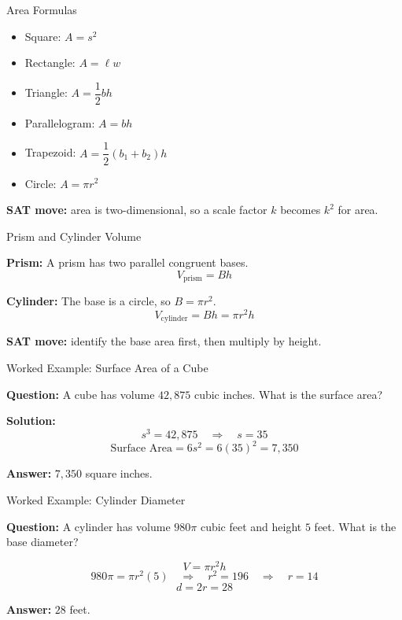 \documentclass{beamer}
\begin{document}
\begin{frame}{Area Formulas}

\begin{itemize}
    \item Square: $A = s^2$
    \item Rectangle: $A = \ell w$
    \item Triangle: $A = \dfrac{1}{2}bh$
    \item Parallelogram: $A = bh$
    \item Trapezoid: $A = \dfrac{1}{2}(b_1+b_2)h$
    \item Circle: $A = \pi r^2$
\end{itemize}

\vspace{0.2cm}
\textbf{SAT move:} area is two-dimensional, so a scale factor $k$ becomes $k^2$ for area.

\end{frame}

\begin{frame}{Prism and Cylinder Volume}

\textbf{Prism:} A prism has two parallel congruent bases.
\[
V_{\text{prism}} = Bh
\]

\textbf{Cylinder:} The base is a circle, so $B=\pi r^2$.
\[
V_{\text{cylinder}} = Bh = \pi r^2h
\]

\vspace{0.15cm}
\textbf{SAT move:} identify the base area first, then multiply by height.

\end{frame}

\begin{frame}{Worked Example: Surface Area of a Cube}

\textbf{Question:} A cube has volume $42{,}875$ cubic inches. What is the surface area?

\vspace{0.2cm}
\textbf{Solution:}
\[
s^3 = 42{,}875 \quad \Rightarrow \quad s = 35
\]
\[
\text{Surface Area} = 6s^2 = 6(35)^2 = 7{,}350
\]

\textbf{Answer:} $\boxed{7{,}350}$ square inches.

\end{frame}

\begin{frame}{Worked Example: Cylinder Diameter}

\textbf{Question:} A cylinder has volume $980\pi$ cubic feet and height $5$ feet. What is the base diameter?

\vspace{0.2cm}
\[
V=\pi r^2h
\]
\[
980\pi = \pi r^2(5) \quad \Rightarrow \quad r^2=196 \quad \Rightarrow \quad r=14
\]
\[
d=2r=28
\]

\textbf{Answer:} $\boxed{28}$ feet.

\end{frame}
\end{document}
